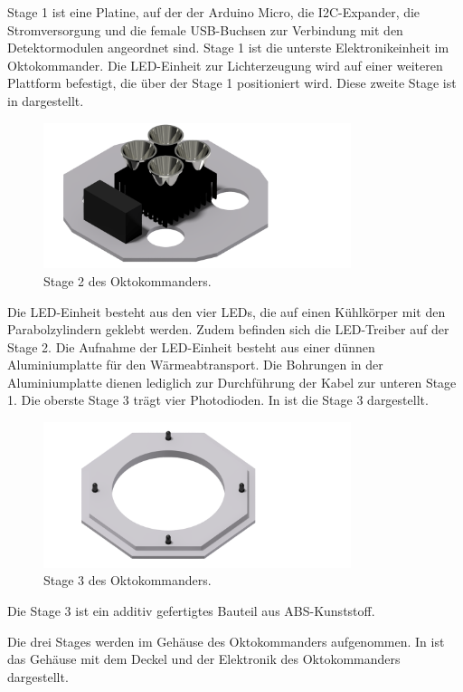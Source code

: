 Stage 1 ist eine Platine, auf der der Arduino Micro, die I2C-Expander, die Stromversorgung und die female USB-Buchsen zur Verbindung mit den Detektormodulen angeordnet sind. Stage 1 ist die unterste Elektronikeinheit im Oktokommander. Die LED-Einheit zur Lichterzeugung wird auf einer weiteren Plattform befestigt, die über der Stage 1 positioniert wird. Diese zweite Stage ist in  dargestellt.

\begin{figure}[h]
	\centering
	\includegraphics[width=9cm]{../CAD_Bilder/OktagonElektronik_Stage2_raytraced.png}
	\caption{Stage 2 des Oktokommanders.}
	\label{fig:OktoStage2}
\end{figure}

Die LED-Einheit besteht aus den vier LEDs, die auf einen Kühlkörper mit den Parabolzylindern geklebt werden. Zudem befinden sich die LED-Treiber auf der Stage 2. Die Aufnahme der LED-Einheit besteht aus einer dünnen Aluminiumplatte für den Wärmeabtransport. Die Bohrungen in der Aluminiumplatte dienen lediglich zur Durchführung der Kabel zur unteren Stage 1. Die oberste Stage 3 trägt vier Photodioden. In  ist die Stage 3 dargestellt.

\begin{figure}[h]
	\centering
	\includegraphics[width=9cm]{../CAD_Bilder/OktagonElektronik_Stage3_raytraced.png}
	\caption{Stage 3 des Oktokommanders.}
	\label{fig:OktoStage3}
\end{figure}

Die Stage 3 ist ein additiv gefertigtes Bauteil aus ABS-Kunststoff.

Die drei Stages werden im Gehäuse des Oktokommanders aufgenommen. In  ist das Gehäuse mit dem Deckel und der Elektronik des Oktokommanders dargestellt.

